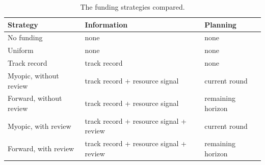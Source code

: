 \begin{table}[t]
\centering
\footnotesize
\setlength{\tabcolsep}{4pt}
\begin{tabular*}{\textwidth}{@{\extracolsep{\fill}}lll@{}}
\toprule
Strategy & Information & Planning \\
\midrule
No funding & none & none \\
Uniform & none & none \\
Track record & track record & none \\
Myopic, without review & track record + resource signal & current round \\
Forward, without review & track record + resource signal & remaining horizon \\
Myopic, with review & track record + resource signal + review & current round \\
Forward, with review & track record + resource signal + review & remaining horizon \\
\bottomrule
\end{tabular*}
\caption{The funding strategies compared.}
\label{tab:strategies}
\end{table}

